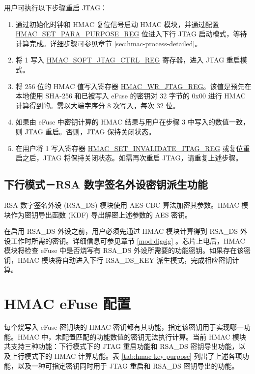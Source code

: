\documentclass[main\_\_CN.tex]{subfiles}
\begin{document}
用户可执行以下步骤重启 JTAG：

\begin{enumerate}
    \item 通过初始化时钟和 HMAC 复位信号启动 HMAC 模块，并通过配置 \hyperref[regdesc:HMACSETPARAPURPOSEREG]{HMAC\_SET\_PARA\_PURPOSE\_REG} 位进入下行 JTAG 启动模式，等待计算完成。详细步骤可参见章节 \ref{sec:hmac-process-detailed}。
    \item 将 1 写入 \hyperref[regdesc:HMACSOFTJTAGCTRLREG]{HMAC\_SOFT\_JTAG\_CTRL\_REG} 寄存器，进入 JTAG 重启模式。
    \item 将 256 位的 HMAC 值写入寄存器 \hyperref[regdesc:HMACWRJTAGREG]{HMAC\_WR\_JTAG\_REG}。该值是预先在本地使用 SHA-256 和已被写入 eFuse 的密钥对 32 字节的 0x00 进行 HMAC 计算得到的。需以大端字序分 8 次写入，每次 32 位。
    \item 如果由 eFuse 中密钥计算的 HMAC 结果与用户在步骤 3 中写入的数值一致，则 JTAG 重启。否则，JTAG 保持关闭状态。
    \item 在用户将 1 写入寄存器 \hyperref[regdesc:HMACSETINVALIDATEJTAGREG]{HMAC\_SET\_INVALIDATE\_JTAG\_REG} 或复位重启之后，JTAG 将保持关闭状态。如需再次重启 JTAG，请重复上述步骤。
    \end{enumerate}

\subsection{下行模式－RSA 数字签名外设密钥派生功能}

RSA 数字签名外设 (RSA\_DS) 模块使用 AES-CBC 算法加密其参数。HMAC 模块作为密钥导出函数 (KDF) 导出解密上述参数的 AES 密钥。

在启用 RSA\_DS 外设之前，用户必须先通过 HMAC 模块计算得到 RSA\_DS 外设工作时所需的密钥。详细信息可参见章节 \ref{mod:digsig} \textit{}。芯片上电后，HMAC 模块将检查 eFuse 中是否烧写有 RSA\_DS 外设所需要的功能密钥。如果存在该密钥，HMAC 模块将自动进入下行 RSA\_DS\_KEY 派生模式，完成相应密钥计算。

\section{HMAC eFuse 配置}
\label{sec:hmac-config-function}

每个烧写入 eFuse 密钥块的 HMAC 密钥都有其功能，指定该密钥用于实现哪一功能。HMAC 中，未配置匹配的功能数值的密钥无法执行计算。当前 HMAC 模块共支持三种功能：下行模式下的 JTAG 重启功能和 RSA\_DS 密钥导出功能，以及上行模式下的 HMAC 计算功能。表 \ref{tab:hmac-key-purpose} 列出了上述各项功能，以及一种可指定密钥同时用于 JTAG 重启和 RSA\_DS 密钥导出的功能。
\end{document}
